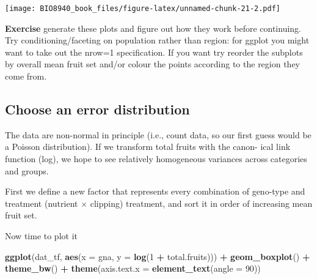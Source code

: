 \documentclass[
  12pt,
]{book}
\newenvironment{Shaded}{\begin{snugshade}}{\end{snugshade}}
\newcommand{\DataTypeTok}[1]{\textcolor[rgb]{0.13,0.29,0.53}{#1}}
\newcommand{\DecValTok}[1]{\textcolor[rgb]{0.00,0.00,0.81}{#1}}
\newcommand{\KeywordTok}[1]{\textcolor[rgb]{0.13,0.29,0.53}{\textbf{#1}}}
\newcommand{\NormalTok}[1]{#1}
\newcommand{\OperatorTok}[1]{\textcolor[rgb]{0.81,0.36,0.00}{\textbf{#1}}}
\newcommand{\StringTok}[1]{\textcolor[rgb]{0.31,0.60,0.02}{#1}}
\begin{document}
\texttt{[image: BIO8940\_book\_files/figure-latex/unnamed-chunk-21-2.pdf]}

\textbf{Exercise} generate these plots and figure out how they work before continuing. Try conditioning/faceting on population rather than region: for ggplot you might want to take out the nrow=1 specification. If you want try reorder the subplots by overall mean fruit set and/or colour the points according to the region they come from.

\hypertarget{choose-an-error-distribution}{%
\subsection{Choose an error distribution}\label{choose-an-error-distribution}}

The data are non-normal in principle (i.e., count data, so our first guess would be a Poisson distribution). If we transform total fruits with the canon- ical link function (log), we hope to see relatively homogeneous variances across categories and groups.

First we define a new factor that represents every combination of geno-type and treatment (nutrient × clipping) treatment, and sort it in order of increasing mean fruit set.

\begin{Shaded}
\end{Shaded}

Now time to plot it

\begin{Shaded}
\begin{Highlighting}[]
\KeywordTok{ggplot}\NormalTok{(dat_tf, }\KeywordTok{aes}\NormalTok{(}\DataTypeTok{x =}\NormalTok{ gna, }\DataTypeTok{y =} \KeywordTok{log}\NormalTok{(}\DecValTok{1} \OperatorTok{+}\StringTok{ }\NormalTok{total.fruits))) }\OperatorTok{+}
\StringTok{  }\KeywordTok{geom_boxplot}\NormalTok{() }\OperatorTok{+}
\StringTok{  }\KeywordTok{theme_bw}\NormalTok{() }\OperatorTok{+}
\StringTok{  }\KeywordTok{theme}\NormalTok{(}\DataTypeTok{axis.text.x =} \KeywordTok{element_text}\NormalTok{(}\DataTypeTok{angle =} \DecValTok{90}\NormalTok{))}
\end{Highlighting}
\end{Shaded}
\end{document}
